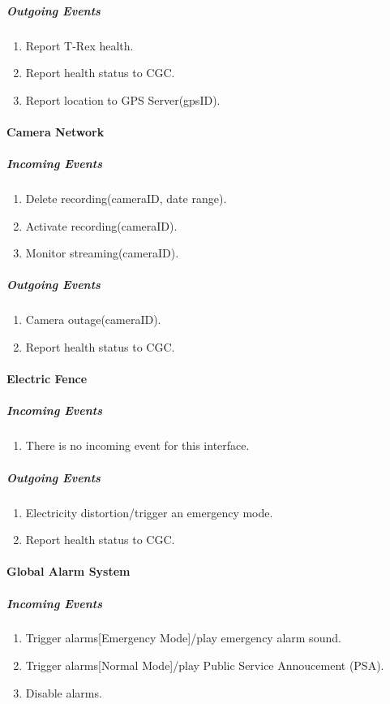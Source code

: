 \documentclass[12pt]{article}
\begin{document}
			\subparagraph{Outgoing Events}
				\begin{enumerate}
                    \item Report T-Rex health. 
                    \item Report health status to CGC. 
					\item Report location to GPS Server(gpsID). 
				\end{enumerate}

		\paragraph{Camera Network}
		\textit{}
			\subparagraph{Incoming Events}
				\begin{enumerate}
					\item Delete recording(cameraID, date range).
                    \item Activate recording(cameraID). 
                    \item Monitor streaming(cameraID).
				\end{enumerate}
				
			\subparagraph{Outgoing Events}
				\begin{enumerate}
                   \item Camera outage(cameraID).
                    \item Report health status to CGC. 
				\end{enumerate}

		\paragraph{Electric Fence}
		\textit{}
			\subparagraph{Incoming Events}
				\begin{enumerate}
                    \item There is no incoming event for this interface.
				\end{enumerate}
				
			\subparagraph{Outgoing Events}
				\begin{enumerate}
					\item Electricity distortion/trigger an emergency mode. 
                    \item Report health status to CGC. 
				\end{enumerate}

		\paragraph{Global Alarm System}
		\textit{}
			\subparagraph{Incoming Events}
				\begin{enumerate}
					\item Trigger alarms[Emergency Mode]/play emergency alarm sound.
                    \item Trigger alarms[Normal Mode]/play Public Service Annoucement (PSA).
                    \item Disable alarms.
				\end{enumerate}
				
\end{document}
